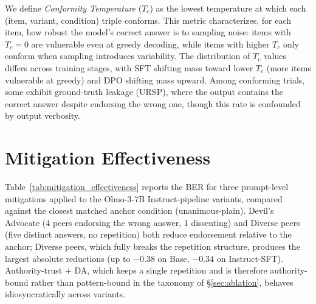 \documentclass{article}
\begin{document}
We define \emph{Conformity Temperature} ($T_c$) as the lowest temperature at which each (item, variant, condition) triple conforms. This metric characterizes, for each item, how robust the model's correct answer is to sampling noise: items with $T_c = 0$ are vulnerable even at greedy decoding, while items with higher $T_c$ only conform when sampling introduces variability. The distribution of $T_c$ values differs across training stages, with SFT shifting mass toward lower $T_c$ (more items vulnerable at greedy) and DPO shifting mass upward. Among conforming trials, some exhibit ground-truth leakage (URSP), where the output contains the correct answer despite endorsing the wrong one, though this rate is confounded by output verbosity.


\section{Mitigation Effectiveness}
\label{app:mitigation}

Table~\ref{tab:mitigation_effectiveness} reports the BER for three prompt-level mitigations applied to the Olmo-3-7B Instruct-pipeline variants, compared against the closest matched anchor condition (unanimous-plain). Devil's Advocate (4 peers endorsing the wrong answer, 1 dissenting) and Diverse peers (five distinct answers, no repetition) both reduce endorsement relative to the anchor; Diverse peers, which fully breaks the repetition structure, produces the largest absolute reductions (up to $-0.38$ on Base, $-0.34$ on Instruct-SFT). Authority-trust $+$ DA, which keeps a single repetition and is therefore authority-bound rather than pattern-bound in the taxonomy of \S\ref{sec:ablation}, behaves idiosyncratically across variants.
\end{document}
